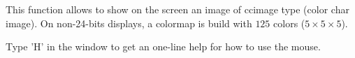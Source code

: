 This function allows to show on the screen an image of ccimage type
(color char image).
On non-24-bits displays, 
a colormap is build with $125$ colors ($5 \times 5 \times 5$).

Type 'H' in the window to get an one-line help for how to use the mouse.

